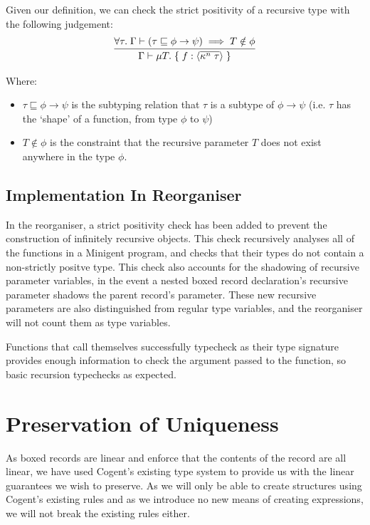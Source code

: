 Given our definition, we can check the strict positivity of a recursive type with the following judgement:
$$
\infer{
    \Gamma \vdash \mu T.\; \{\; f: \langle \overline{\kappa^n\; \tau} \rangle\; \}
}{
   \forall \tau.\; \Gamma \vdash (\tau \sqsubseteq \phi \rightarrow \psi) \implies T \notin \phi
}
$$

Where:
\begin{itemize}
    \item 
        $\tau \sqsubseteq \phi \rightarrow \psi$ is the subtyping relation that $\tau$ 
        is a subtype of $\phi \rightarrow \psi$ 
        (i.e. $\tau$ has the `shape' of a function, from type $\phi$ to $\psi$) 
    \item
        $T \notin \phi$ is the constraint that the recursive parameter $T$ 
        does not exist anywhere in the type $\phi$.
\end{itemize}


\subsection{Implementation In Reorganiser}

In the reorganiser, a strict positivity check has been added to prevent the construction of infinitely
recursive objects. This check recursively analyses all of the functions in a Minigent program, and
checks that their types do not contain a non-strictly positve type. This check also accounts for the
shadowing of recursive parameter variables, in the event a nested boxed record declaration's recursive
parameter shadows the parent record's parameter. These new recursive parameters are also distinguished from
regular type variables, and the reorganiser will not count them as type variables.

Functions that call themselves successfully typecheck as their type signature provides enough information
to check the argument passed to the function, so basic recursion typechecks as expected.

\section{Preservation of Uniqueness}

As boxed records are linear and enforce that the contents of the record are all linear, we
have used Cogent's existing type system to provide us with the linear guarantees we wish to preserve.
As we will only be able to create structures using Cogent's existing rules and as we introduce
no new means of creating expressions, we will not break the existing rules either. 

